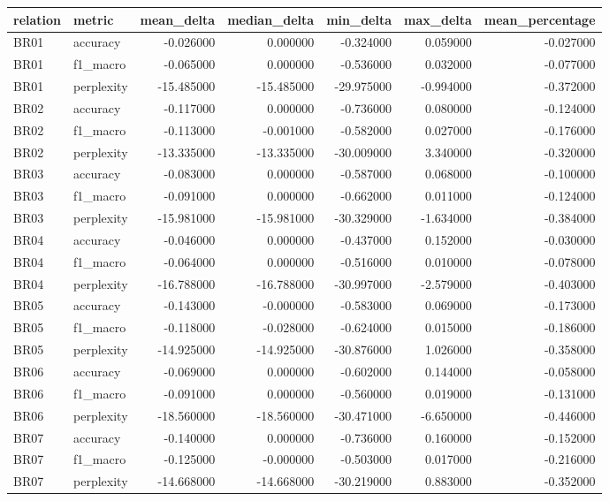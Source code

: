 \begin{tabular}{llrrrrr}
\toprule
relation & metric & mean_delta & median_delta & min_delta & max_delta & mean_percentage \\
\midrule
BR01 & accuracy & -0.026000 & 0.000000 & -0.324000 & 0.059000 & -0.027000 \\
BR01 & f1_macro & -0.065000 & 0.000000 & -0.536000 & 0.032000 & -0.077000 \\
BR01 & perplexity & -15.485000 & -15.485000 & -29.975000 & -0.994000 & -0.372000 \\
BR02 & accuracy & -0.117000 & 0.000000 & -0.736000 & 0.080000 & -0.124000 \\
BR02 & f1_macro & -0.113000 & -0.001000 & -0.582000 & 0.027000 & -0.176000 \\
BR02 & perplexity & -13.335000 & -13.335000 & -30.009000 & 3.340000 & -0.320000 \\
BR03 & accuracy & -0.083000 & 0.000000 & -0.587000 & 0.068000 & -0.100000 \\
BR03 & f1_macro & -0.091000 & 0.000000 & -0.662000 & 0.011000 & -0.124000 \\
BR03 & perplexity & -15.981000 & -15.981000 & -30.329000 & -1.634000 & -0.384000 \\
BR04 & accuracy & -0.046000 & 0.000000 & -0.437000 & 0.152000 & -0.030000 \\
BR04 & f1_macro & -0.064000 & 0.000000 & -0.516000 & 0.010000 & -0.078000 \\
BR04 & perplexity & -16.788000 & -16.788000 & -30.997000 & -2.579000 & -0.403000 \\
BR05 & accuracy & -0.143000 & -0.000000 & -0.583000 & 0.069000 & -0.173000 \\
BR05 & f1_macro & -0.118000 & -0.028000 & -0.624000 & 0.015000 & -0.186000 \\
BR05 & perplexity & -14.925000 & -14.925000 & -30.876000 & 1.026000 & -0.358000 \\
BR06 & accuracy & -0.069000 & 0.000000 & -0.602000 & 0.144000 & -0.058000 \\
BR06 & f1_macro & -0.091000 & 0.000000 & -0.560000 & 0.019000 & -0.131000 \\
BR06 & perplexity & -18.560000 & -18.560000 & -30.471000 & -6.650000 & -0.446000 \\
BR07 & accuracy & -0.140000 & 0.000000 & -0.736000 & 0.160000 & -0.152000 \\
BR07 & f1_macro & -0.125000 & -0.000000 & -0.503000 & 0.017000 & -0.216000 \\
BR07 & perplexity & -14.668000 & -14.668000 & -30.219000 & 0.883000 & -0.352000 \\

\end{tabular}
